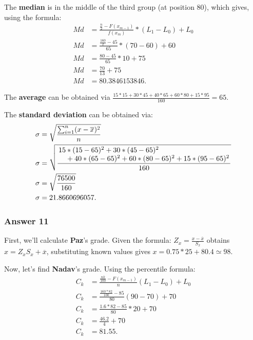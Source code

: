 \documentclass[11pt]{article}
\begin{document}
The \textbf{median} is in the middle of the third group (at position 80), which
gives, using the formula:
\begin{equation*}
  \begin{aligned}
    Md &= \frac{\frac{n}{2} - F(x_{m-1})}{f(x_m)} * (L_1-L_0)+L_0 \\
    Md &= \frac{\frac{160}{2} - 45}{65} * (70 - 60) + 60 \\
    Md &= \frac{80 - 45}{65} * 10 + 75 \\
    Md &= \frac{70}{13} + 75 \\
    Md &= 80.3846153846.
  \end{aligned}
\end{equation*}

The \textbf{average} can be obtained via $\frac{15*15+30*45+40*65+60*80+15*95}{160}=65$.

The \textbf{standard deviation} can be obtained via:
\begin{equation*}
  \begin{aligned}
    \sigma &= \sqrt{\frac{\sum_{i=1}^n (x-\overline{x})^2}{n}} \\
    \sigma &= \sqrt{\frac{\splitfrac{15 * (15 - 65)^2 + 30 * (45 - 65)^2}
        {+ 40 * (65 - 65)^2 + 60 * (80 - 65)^2 + 15 * (95 - 65)^2}}{160}} \\
    \sigma &= \sqrt{\frac{76500}{160}} \\
    \sigma &= 21.8660696057.
  \end{aligned}
\end{equation*}
\subsubsection{Answer 11}
\label{sec-1-3-3}
First, we'll calculate \textbf{Paz}'s grade.  Given the formula:
$Z_x=\frac{x-\overline{x}}{S_x}$ obtains $x=Z_xS_x + \overline{x}$,
substituting known values gives $x=0.75 * 25 + 80.4 \simeq 98$.

Now, let's find \textbf{Nadav}'s grade.  Using the percentile formula:
\begin{equation*}
  \begin{aligned}
    C_k &= \frac{\frac{nk}{100} - F(x_{m-1})}{n}(L_1 - L_0) + L_0 \\
    C_k &= \frac{\frac{160*82}{100} - 85}{80}(90 - 70) + 70 \\
    C_k &= \frac{1.6*82 - 85}{80} * 20 + 70 \\
    C_k &= \frac{46.2}{4} + 70 \\
    C_k &= 81.55.
  \end{aligned}
\end{equation*}
\end{document}
